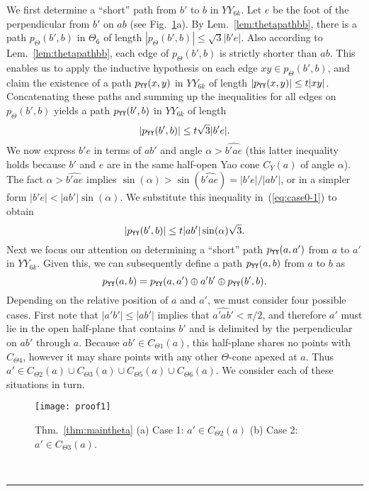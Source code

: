 \documentclass[11pt]{article}
\newcommand\cone{{C}}
\newcommand\pyy{p_{{\tt YY}}}
\newcommand\ang[1]{\widehat{#1}}
\newcommand{\qed}{\rule{0.5em}{1.5ex}}
\newcommand{\fqed}{{\hfill~\qed}}
\newenvironment{proof}{{\noindent \bf Proof.}}
                      {{\hfill \fqed} \vspace{1em}}
\begin{document}
\begin{proof}
We first determine a ``short'' path from $b'$ to $b$ in $YY_{6k}$. Let $e$ be the foot of the perpendicular from $b'$ on $ab$ (see Fig.~\ref{fig:proof1}a). By Lem.~\ref{lem:thetapathbb}, there is a path $p_\Theta(b',b)$ in $\Theta_6$ of length $|p_\Theta(b',b)| \le \sqrt{3}|b'e|$. Also according to Lem.~\ref{lem:thetapathbb}, each edge of $p_\Theta(b',b)$ is strictly shorter than $ab$. This enables us to apply the inductive hypothesis on each edge $xy \in p_\Theta(b',b)$, and claim the existence of a path $\pyy(x, y)$ in $YY_{6k}$ of length $|\pyy(x, y)| \le t|xy|$. Concatenating these paths and summing up the inequalities for all edges on $p_\Theta(b',b)$ yields a path $\pyy(b',b)$ in $YY_{6k}$ of length
\begin{equation}
|\pyy(b',b)| \le t\sqrt{3}|b'e|.
\label{eq:case0-1}
\end{equation}
We now express $b'e$ in terms of $ab'$ and angle $\alpha > \ang{b'ae}$ (this latter inequality holds because $b'$ and $e$ are in the same half-open Yao cone $\cone_Y(a)$ of angle $\alpha$). The fact $\alpha > \ang{b'ae}$ implies  $\sin(\alpha) > \sin(\ang{b'ae}) = |b'e| / |ab'|$, or in a simpler form $|b'e| < |ab'|\sin(\alpha)$. We substitute this inequality in~(\ref{eq:case0-1}) to obtain
\begin{equation}
|\pyy(b',b)| \le t|ab'|\sin(\alpha)\sqrt{3}.
\label{eq:case0-2}
\end{equation}
Next we focus our attention on determining a ``short'' path $\pyy(a, a')$ from $a$ to $a'$ in $YY_{6k}$. Given this, we can subsequently define a path $\pyy(a, b)$ from $a$ to $b$ as
\begin{equation}
\pyy(a,b) = \pyy(a, a') \oplus a'b' \oplus \pyy(b',b).
\label{eq:pab}
\end{equation}
Depending on the relative position of $a$ and $a'$, we must consider four possible cases. First note that $|a'b'| \le |ab'|$ implies that $\ang{a'ab'} < \pi/2$, and therefore $a'$ must lie in the open half-plane that contains $b'$ and is delimited by the perpendicular on $ab'$ through $a$. Because $ab' \in \cone_{\Theta1}(a)$, this half-plane shares no points with $C_{\Theta4}$, however it may share points with any other $\Theta$-cone apexed at $a$.
Thus $a' \in \cone_{\Theta2}(a) \cup \cone_{\Theta3}(a) \cup \cone_{\Theta5}(a) \cup \cone_{\Theta6}(a)$. We consider each of these situations in turn.

\begin{figure}[htpb]
\centering
\texttt{[image: proof1]}
\caption{Thm.~\ref{thm:maintheta} (a) Case 1: $a' \in \cone_{\Theta2}(a)$ (b) Case 2: $a' \in \cone_{\Theta3}(a)$.}
\label{fig:proof1}
\end{figure}



\end{proof}
\end{document}
